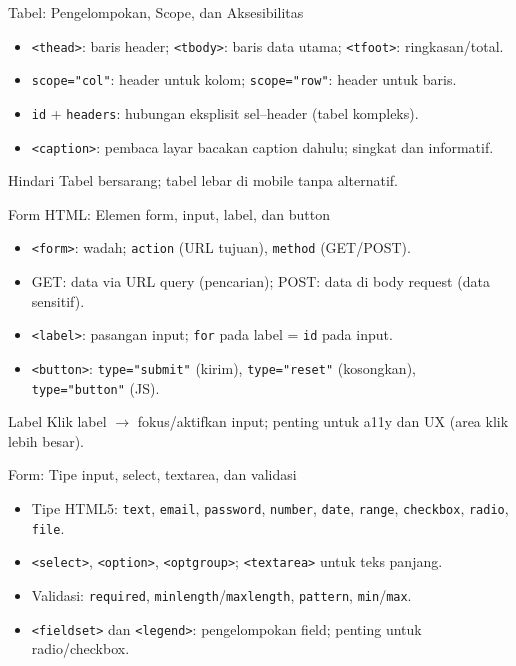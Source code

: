 \documentclass[handout]{beamer}
\begin{document}
\begin{frame}{Tabel: Pengelompokan, Scope, dan Aksesibilitas}
	\begin{itemize}
		\item \texttt{<thead>}: baris header; \texttt{<tbody>}: baris data utama; \texttt{<tfoot>}: ringkasan/total.
		\item \texttt{scope="col"}: header untuk kolom; \texttt{scope="row"}: header untuk baris.
		\item \texttt{id} + \texttt{headers}: hubungan eksplisit sel--header (tabel kompleks).
		\item \texttt{<caption>}: pembaca layar bacakan caption dahulu; singkat dan informatif.
	\end{itemize}
	\begin{block}{Hindari}
		Tabel bersarang; tabel lebar di mobile tanpa alternatif.
	\end{block}
\end{frame}

\begin{frame}{Form HTML: Elemen form, input, label, dan button}
	\begin{itemize}
		\item \texttt{<form>}: wadah; \texttt{action} (URL tujuan), \texttt{method} (GET/POST).
		\item GET: data via URL query (pencarian); POST: data di body request (data sensitif).
		\item \texttt{<label>}: pasangan input; \texttt{for} pada label = \texttt{id} pada input.
		\item \texttt{<button>}: \texttt{type="submit"} (kirim), \texttt{type="reset"} (kosongkan), \texttt{type="button"} (JS).
	\end{itemize}
	\begin{block}{Label}
		Klik label $\to$ fokus/aktifkan input; penting untuk a11y dan UX (area klik lebih besar).
	\end{block}
\end{frame}

\begin{frame}{Form: Tipe input, select, textarea, dan validasi}
	\begin{itemize}
		\item Tipe HTML5: \texttt{text}, \texttt{email}, \texttt{password}, \texttt{number}, \texttt{date}, \texttt{range}, \texttt{checkbox}, \texttt{radio}, \texttt{file}.
		\item \texttt{<select>}, \texttt{<option>}, \texttt{<optgroup>}; \texttt{<textarea>} untuk teks panjang.
		\item Validasi: \texttt{required}, \texttt{minlength}/\texttt{maxlength}, \texttt{pattern}, \texttt{min}/\texttt{max}.
		\item \texttt{<fieldset>} dan \texttt{<legend>}: pengelompokan field; penting untuk radio/checkbox.
	\end{itemize}
\end{frame}
\end{document}
